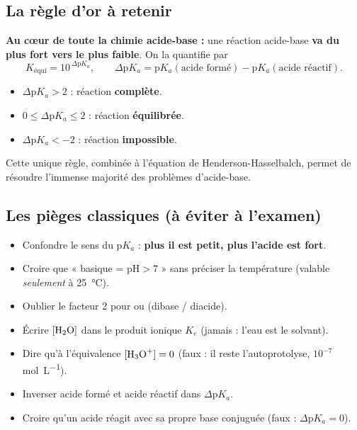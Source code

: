 \documentclass[11pt,a4paper]{article}
\begin{document}
\subsection{La règle d'or à retenir}

\begin{tcolorbox}[boxbase,colback=primary!5,colframe=primary]
\textbf{Au cœur de toute la chimie acide-base :} une réaction acide-base \textbf{va du plus fort vers le plus
faible}. On la quantifie par
\[ \boxed{K_{\text{équi}} = 10^{\,\Delta\mathrm{p}K_a}},\qquad
   \Delta\mathrm{p}K_a = \mathrm{p}K_a(\text{acide formé}) - \mathrm{p}K_a(\text{acide réactif}). \]
\begin{itemize}[leftmargin=1.6em,topsep=2pt,itemsep=1pt]
  \item $\Delta\mathrm{p}K_a > 2$ : réaction \textbf{complète}.
  \item $0 \leq \Delta\mathrm{p}K_a \leq 2$ : réaction \textbf{équilibrée}.
  \item $\Delta\mathrm{p}K_a < -2$ : réaction \textbf{impossible}.
\end{itemize}
Cette unique règle, combinée à l'équation de Henderson-Hasselbalch, permet de résoudre l'immense majorité
des problèmes d'acide-base.
\end{tcolorbox}

\subsection{Les pièges classiques (à éviter à l'examen)}

\begin{attention}
\begin{itemize}[leftmargin=1.6em,topsep=2pt,itemsep=2pt]
  \item Confondre le sens du $\mathrm{p}K_a$ : \textbf{plus il est petit, plus l'acide est fort}.
  \item Croire que « basique = $\mathrm{pH}>7$ » sans préciser la température (valable \emph{seulement} à
        \SI{25}{\celsius}).
  \item Oublier le facteur 2 pour  ou  (dibase / diacide).
  \item Écrire $[\ce{H2O}]$ dans le produit ionique $K_e$ (jamais : l'eau est le solvant).
  \item Dire qu'à l'équivalence $[\ce{H3O+}]=0$ (faux : il reste l'autoprotolyse, $10^{-7}$ \si{mol.L^{-1}}).
  \item Inverser acide formé et acide réactif dans $\Delta\mathrm{p}K_a$.
  \item Croire qu'un acide réagit avec sa propre base conjuguée (faux : $\Delta\mathrm{p}K_a = 0$).
\end{itemize}
\end{attention}
\end{document}
